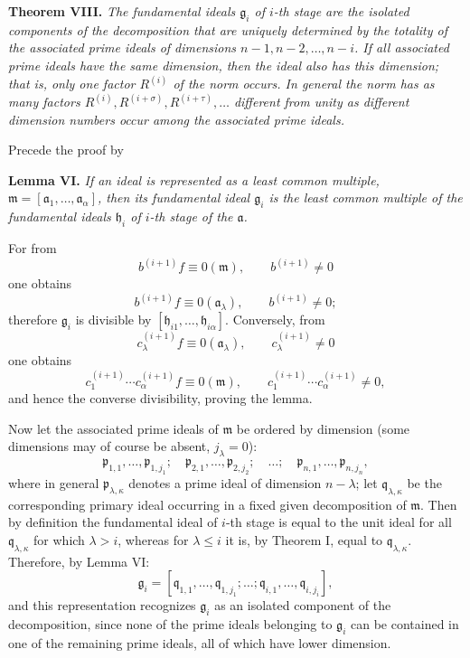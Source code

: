 \documentclass[11pt]{article}
\providecommand{\frakm}{\mathfrak m}
\providecommand{\frakp}{\mathfrak p}
\providecommand{\frakq}{\mathfrak q}
\providecommand{\fraka}{\mathfrak a}
\providecommand{\frakg}{\mathfrak g}
\providecommand{\frakh}{\mathfrak h}
\providecommand{\fraka}{\mathfrak a}
\providecommand{\frakp}{\mathfrak p}
\providecommand{\frakp}{\mathfrak p}
\providecommand{\frakq}{\mathfrak q}
\begin{document}
\textbf{Theorem VIII.} \emph{The fundamental ideals $\frakg_i$ of $i$-th stage are the isolated components of the decomposition that are uniquely determined by the totality of the associated prime ideals of dimensions $n-1,n-2,\ldots,n-i$. If all associated prime ideals have the same dimension, then the ideal also has this dimension; that is, only one factor $R^{(i)}$ of the norm occurs. In general the norm has as many factors $R^{(i)},R^{(i+\sigma)},R^{(i+\tau)},\ldots$ different from unity as different dimension numbers occur among the associated prime ideals.}

Precede the proof by

\textbf{Lemma VI.} \emph{If an ideal is represented as a least common multiple, $\frakm=[\fraka_1,\ldots,\fraka_\alpha]$, then its fundamental ideal $\frakg_i$ is the least common multiple of the fundamental ideals $\frakh_i$ of $i$-th stage of the $\fraka$.}

For from
\[
 b^{(i+1)}f\equiv0(\frakm),\qquad b^{(i+1)}\ne0
\]
one obtains
\[
 b^{(i+1)}f\equiv0(\fraka_\lambda),\qquad b^{(i+1)}\ne0;
\]
therefore $\frakg_i$ is divisible by $[\frakh_{i1},\ldots,\frakh_{i\alpha}]$. Conversely, from
\[
 c_\lambda^{(i+1)}f\equiv0(\fraka_\lambda),\qquad c_\lambda^{(i+1)}\ne0
\]
one obtains
\[
 c_1^{(i+1)}\cdots c_\alpha^{(i+1)}f\equiv0(\frakm),\qquad
 c_1^{(i+1)}\cdots c_\alpha^{(i+1)}\ne0,
\]
and hence the converse divisibility, proving the lemma.

Now let the associated prime ideals of $\frakm$ be ordered by dimension (some dimensions may of course be absent, $j_\lambda=0$):
\[
 \frakp_{1,1},\ldots,\frakp_{1,j_1};\quad
 \frakp_{2,1},\ldots,\frakp_{2,j_2};\quad\ldots;\quad
 \frakp_{n,1},\ldots,\frakp_{n,j_n},
\]
where in general $\frakp_{\lambda,\kappa}$ denotes a prime ideal of dimension $n-\lambda$; let $\frakq_{\lambda,\kappa}$ be the corresponding primary ideal occurring in a fixed given decomposition of $\frakm$. Then by definition the fundamental ideal of $i$-th stage is equal to the unit ideal for all $\frakq_{\lambda,\kappa}$ for which $\lambda>i$, whereas for $\lambda\le i$ it is, by Theorem I, equal to $\frakq_{\lambda,\kappa}$. Therefore, by Lemma VI:
{\let\veqno\leqno\begin{equation}
 \tag{5}
 \frakg_i=[\frakq_{1,1},\ldots,\frakq_{1,j_1};\ldots;\frakq_{i,1},\ldots,\frakq_{i,j_i}],
\end{equation}}
and this representation recognizes $\frakg_i$ as an isolated component of the decomposition, since none of the prime ideals belonging to $\frakg_i$ can be contained in one of the remaining prime ideals, all of which have lower dimension.
\end{document}
